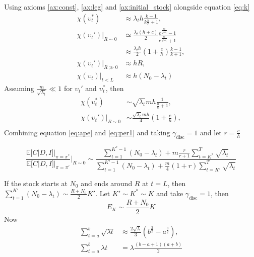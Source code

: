 Using axioms \ref{ax:const}, \ref{ax:leg} and \ref{ax:initial_stock} alongside equation \eqref{eq:k}
\begin{equation}
	\begin{split}
		\chi(\upsilon_t^*)&\approx \lambda_th\frac{k-1}{k\frac{h}{c}+1},\\
		\chi(\upsilon_t')|_{R\sim 0} &\simeq \frac{\lambda_t(h+c)}{2}
		\frac{e^{\frac{m}{\sqrt{\lambda_t}}}-1}{e^{\frac{m}{\sqrt{\lambda_t}}}+1}\\
		&\approx \frac{\lambda_th}{2}(1+\frac{c}{h})\frac{k-1}{k+1},\\
		\chi(\upsilon_t')|_{R\gg 0} &\approx hR,\\
		\chi(\upsilon_t)|_{t<L}&\approx h(N_0-\lambda_t)
	\end{split}
	\label{eq:ape}
\end{equation}
Assuming $\frac{m}{\sqrt{\lambda_t}}\ll 1$ for $\upsilon_t'$ and $\upsilon_t^*$, then
\begin{equation}
	\begin{split}
		\chi(\upsilon_t^*)&\sim \sqrt{\lambda_t}mh\frac{1}{\frac{h}{c}+1},\\
		\chi(\upsilon_t')|_{R\sim 0} &\sim \frac{\sqrt{\lambda_t}mh}{4}(1+\frac{c}{h}),\\
	\end{split}
\end{equation}
Combining equation \eqref{eq:ape} and \eqref{eq:per1} and taking $\gamma_{\text{disc}}=1$ and let $r= \frac{c}{h}$

\begin{equation}
	\frac{\mathbb{E}[C|D,I]|_{\pi = \pi^*} }{\mathbb{E}[C|D,I]|_{\pi = \pi'}}\bigg|_{R\sim 0}\sim \frac{\sum_{t=1}^{K^*-1}(N_0-\lambda_t)+m\frac{r}{r+1}\sum_{t=K^*}^{T}\sqrt{\lambda_t}}{\sum_{t=1}^{K'-1}(N_0-\lambda_t)+\frac{m}{4}(1+r)\sum_{t=K'}^{T} \sqrt{\lambda_t}}
\end{equation}

If the stock starts at $N_0$ and ends around $R$ at $t=L$, then $\sum_{t=1}^{K'}(N_0-\lambda_t)\sim \frac{R+N_0}{2}K'$. Let $K'\sim K^*\sim K$ and take $\gamma_{\text{disc}}=1$, then
\begin{equation}
	E_{K}\sim \frac{R+N_0}{2}K
\end{equation}
Now
\begin{equation}
	\begin{split}
		\sum_{t=a}^b\sqrt{\lambda t}&\approx \frac{2\sqrt{\lambda}}{3}(b^\frac{3}{2}-a^\frac{3}{2}),\\
		\sum_{t=a}^b\lambda t& =\lambda \frac{(b-a+1)(a+b)}{2}
	\end{split}
\end{equation}

